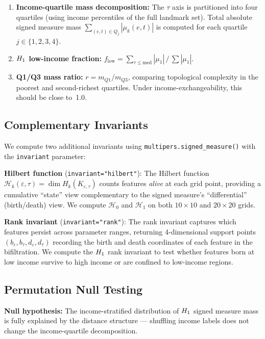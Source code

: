 \begin{enumerate}
  \item \textbf{Income-quartile mass decomposition:} The $\tau$ axis is
    partitioned into four quartiles (using income percentiles of the full
    landmark set). Total absolute signed measure mass
    $\sum_{(e,t) \in Q_j} |\mu_k(e, t)|$ is computed for each quartile
    $j \in \{1, 2, 3, 4\}$.
  \item \textbf{$H_{1}$ low-income fraction:}
    $f_\text{low} = \sum_{\tau \leq \text{med}} |\mu_1|\, /\, \sum |\mu_1|$.
  \item \textbf{Q1/Q3 mass ratio:} $r = m_{Q1} / m_{Q3}$, comparing
    topological complexity in the poorest and second-richest quartiles. Under
    income-exchangeability, this should be close to~1.0.
\end{enumerate}

\subsection{Complementary Invariants}
\label{sec:methods-complementary}

We compute two additional invariants using
\texttt{multipers.signed\_measure()} with the \texttt{invariant} parameter:

\textbf{Hilbert function} (\texttt{invariant="hilbert"}): The Hilbert
function $\mathcal{H}_k(\varepsilon, \tau) = \dim H_k(K_{\varepsilon,\tau})$
counts features \emph{alive} at each grid point, providing a cumulative
``state'' view complementary to the signed measure's ``differential''
(birth/death) view. We compute $\mathcal{H}_0$ and $\mathcal{H}_1$ on both
$10 \times 10$ and $20 \times 20$ grids.

\textbf{Rank invariant} (\texttt{invariant="rank"}): The rank invariant
captures which features persist across parameter ranges, returning
4-dimensional support points $(b_\varepsilon, b_\tau, d_\varepsilon,
d_\tau)$ recording the birth and death coordinates of each feature in the
bifiltration. We compute the $H_{1}$ rank invariant to test whether
features born at low income survive to high income or are confined to
low-income regions.

\subsection{Permutation Null Testing}

\textbf{Null hypothesis:} The income-stratified distribution of $H_{1}$
signed measure mass is fully explained by the distance structure --- shuffling
income labels does not change the income-quartile decomposition.

